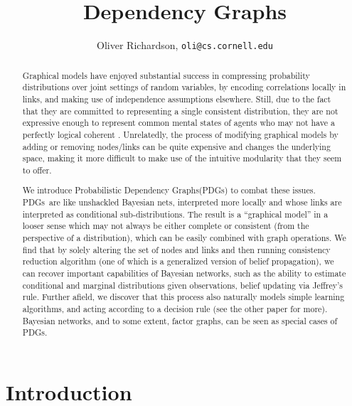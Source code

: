 \documentclass{article}
\title{Dependency Graphs}
\author{Oliver Richardson,  \texttt{oli@cs.cornell.edu}}
\newcommand{\modelnames}{Probabilistic Dependency Graphs}
\newcommand{\MNs}{PDGs}
\begin{document}
	\maketitle

	\begin{abstract}
		Graphical models have enjoyed substantial success in compressing probability distributions over joint settings of random variables, by encoding correlations locally in links, and making use of independence assumptions elsewhere. Still, due to the fact that they are committed to representing a single consistent distribution, they are not expressive enough to represent common mental states of agents who may not have a perfectly logical coherent . Unrelatedly, the process of modifying graphical models by adding or removing nodes/links can be quite expensive and changes the underlying space, making it more difficult to make use of the intuitive modularity that they seem to offer.
		
		We introduce \modelnames (\MNs) to combat these issues. \MNs\ are like unshackled Bayesian nets, interpreted more locally and whose links are interpreted as conditional sub-distributions. The result is a “graphical model” in a looser sense which may not always be either complete or consistent (from the perspective of a distribution), which can be easily combined with graph operations. We find that by solely altering the set of nodes and links and then running consistency reduction algorithm (one of which is a generalized version of belief propagation), we can recover important capabilities of Bayesian networks, such as the ability to estimate conditional and marginal distributions given observations, belief updating via Jeffrey’s rule. Further afield, we discover that this process also naturally models simple learning algorithms, and acting according to a decision rule (see the other paper for more). Bayesian networks, and to some extent, factor graphs, can be seen as special cases of \MNs.
	\end{abstract}

	\tableofcontents

	\section{Introduction}
\end{document}
